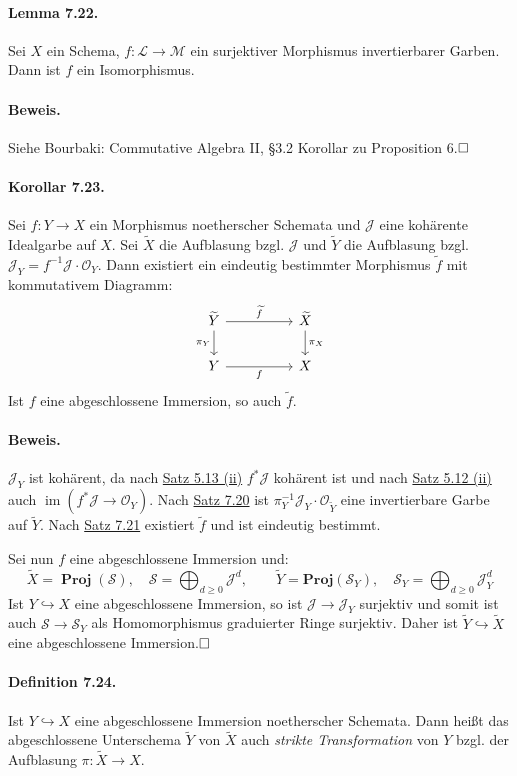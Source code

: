 \documentclass[11pt,b5paper,openany]{memoir}
\def \qed {$\hfill\square$}
\begin{document}
\paragraph{Lemma 7.22.}\label{7.22} Sei $X$ ein Schema, $f:\mathcal{L}\to\mathcal{M}$ ein surjektiver Morphismus invertierbarer Garben. Dann ist $f$ ein Isomorphismus.

\paragraph{Beweis.} Siehe Bourbaki: Commutative Algebra II, §3.2 Korollar zu Proposition 6.\qed

\paragraph{Korollar 7.23.}\label{7.23} Sei $f:Y\to X$ ein Morphismus noetherscher Schemata und $\mathcal{J}$ eine kohärente Idealgarbe auf $X$. Sei $\widetilde{X}$ die Aufblasung bzgl. $\mathcal{J}$ und $\widetilde{Y}$ die Aufblasung bzgl. $\mathcal{J}_Y=f^{-1}\mathcal{J}\cdot\mathcal{O}_Y$. Dann existiert ein eindeutig bestimmter Morphismus $\widetilde{f}$ mit kommutativem Diagramm:
\[\begin{tikzcd}
\widetilde{Y}\ar[rr, "\widetilde{f}"]\dar["\pi_Y"'] && \widetilde{X}\dar["\pi_X"]\\
Y\ar[rr, "f"'] && X
\end{tikzcd}\]
Ist $f$ eine abgeschlossene Immersion, so auch $\widetilde{f}$.

\paragraph{Beweis.} $\mathcal{J}_Y$ ist kohärent, da nach \hyperref[5.13]{Satz 5.13 (ii)} $f^\ast\mathcal{J}$ kohärent ist und nach \hyperref[5.12]{Satz 5.12 (ii)} auch $\operatorname{im}(f^\ast\mathcal{J}\to\mathcal{O}_Y)$. Nach \hyperref[7.20]{Satz 7.20} ist $\pi_Y^{-1}\mathcal{J}_Y\cdot\mathcal{O}_{\widetilde{Y}}$ eine invertierbare Garbe auf $\widetilde{Y}$. Nach \hyperref[7.21]{Satz 7.21} existiert $\widetilde{f}$ und ist eindeutig bestimmt.

Sei nun $f$ eine abgeschlossene Immersion und:
\[\widetilde{X}=\operatorname{\mathbf{Proj}}(\mathcal{S}),\quad \mathcal{S}=\bigoplus_{d\geq 0}\mathcal{J}^d,\qquad\widetilde{Y}=\mathbf{Proj}(\mathcal{S}_Y),\quad\mathcal{S}_Y=\bigoplus_{d\geq 0}\mathcal{J}_Y^d \]
Ist $Y\hookrightarrow X$ eine abgeschlossene Immersion, so ist $\mathcal{J}\to\mathcal{J}_Y$ surjektiv und somit ist auch $\mathcal{S}\to\mathcal{S}_Y$ als Homomorphismus graduierter Ringe surjektiv. Daher ist $\widetilde{Y}\hookrightarrow\widetilde{X}$ eine abgeschlossene Immersion.\qed

\paragraph{Definition 7.24.}\label{7.24} Ist $Y\hookrightarrow X$ eine abgeschlossene Immersion noetherscher Schemata. Dann heißt das abgeschlossene Unterschema $\widetilde{Y}$ von $\widetilde{X}$ auch \textit{strikte Transformation} von $Y$ bzgl. der Aufblasung $\pi:\widetilde{X}\to X$.

\printindex
\end{document}
